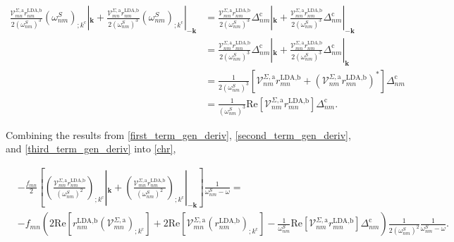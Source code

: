 \documentclass[10pt]{article}
\begin{document}
\begin{align}\label{third_term_gen_deriv}
\frac{\mathcal{V}^{\Sigma,\text{a}}_{mn}r^{\text{LDA,b}}_{nm}}{2(\omega^{S}_{nm})^{3}}\left(\omega^{S}_{nm}\right)_{;k^{\text{c}}}|_{\mathbf{k}} + \frac{\mathcal{V}^{\Sigma,\text{a}}_{mn}r^{\text{LDA,b}}_{nm}}{2(\omega^{S}_{nm})^{3}}\left(\omega^{S}_{nm}\right)_{;k^{\text{c}}}|_{-\mathbf{k}}
&= \frac{\mathcal{V}^{\Sigma,\text{a}}_{mn}r^{\text{LDA,b}}_{nm}}{2(\omega^{S}_{nm})^{3}}\Delta_{nm}^{\text{c}}|_{\mathbf{k}} + \frac{\mathcal{V}^{\Sigma,\text{a}}_{mn}r^{\text{LDA,b}}_{nm}}{2(\omega^{S}_{nm})^{3}}\Delta_{nm}^{\text{c}}|_{-\mathbf{k}}\nonumber\\
&= \frac{\mathcal{V}^{\Sigma,\text{a}}_{nm}r^{\text{LDA,b}}_{mn}}{2(\omega^{S}_{nm})^{3}}\Delta_{nm}^{\text{c}}|_{\mathbf{k}} + \frac{\mathcal{V}^{\Sigma,\text{a}}_{mn}r^{\text{LDA,b}}_{nm}}{2(\omega^{S}_{nm})^{3}}\Delta_{nm}^{\text{c}}|_{\mathbf{k}}\nonumber\\
&= \frac{1}{2(\omega^{S}_{nm})^{3}}\left[\mathcal{V}^{\Sigma,\text{a}}_{nm}r^{\text{LDA,b}}_{mn} + \left(\mathcal{V}^{\Sigma,\text{a}}_{nm}r^{\text{LDA,b}}_{mn}\right)^{*}\right]\Delta_{nm}^{\text{c}}\nonumber\\
&= \frac{1}{(\omega^{S}_{nm})^{3}}\mathrm{Re}\left[\mathcal{V}^{\Sigma,\text{a}}_{nm}r^{\text{LDA,b}}_{mn}\right]\Delta_{nm}^{\text{c}}.
\end{align}

Combining the results from \eqref{first_term_gen_deriv}, \eqref{second_term_gen_deriv}, and \eqref{third_term_gen_deriv} into \eqref{chr},

\begin{align}\label{derivative_under_k}
&-\frac{f_{mn}}{2}\left[\left(\frac{\mathcal{V}^{\Sigma,\text{a}}_{mn}r^{\text{LDA,b}}_{nm}}{(\omega^S_{nm})^2}\right)_{;k^{\text{c}}}|_{\mathbf{k}} + \left(\frac{\mathcal{V}^{\Sigma,\text{a}}_{mn}r^{\text{LDA,b}}_{nm}}{(\omega^S_{nm})^2}\right)_{;k^{\text{c}}}|_{-\mathbf{k}}\right]\frac{1}{\omega^S_{nm}-\omega} = \nonumber\\
&-f_{mn}\left(2\mathrm{Re}\left[r^{\text{LDA,b}}_{nm}\left(\mathcal{V}^{\Sigma,\text{a}}_{mn}\right)_{;k^{\text{c}}}\right] + 2\mathrm{Re}\left[\mathcal{V}^{\Sigma,\text{a}}_{mn}\left(r^{\text{LDA,b}}_{nm}\right)_{;k^{\text{c}}}\right] - \frac{1}{\omega^{S}_{nm}}\mathrm{Re}\left[\mathcal{V}^{\Sigma,\text{a}}_{nm}r^{\text{LDA,b}}_{mn}\right]\Delta_{nm}^{\text{c}}\right)\frac{1}{2(\omega^{S}_{nm})^{2}}\frac{1}{\omega^S_{nm}-\omega}.
\end{align}
\end{document}
